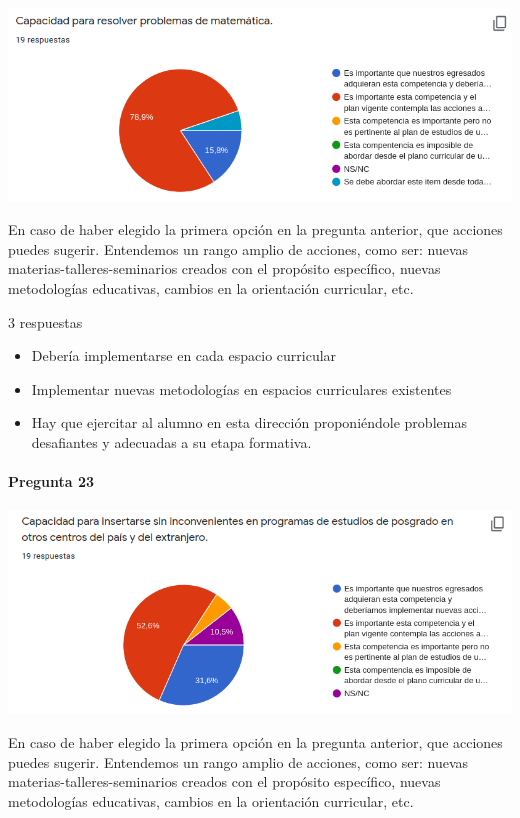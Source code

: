 \documentclass[a4paper,10pt,BCOR10mm,oneside,headsepline]{scrbook}
\begin{document}
\begin{subappendices}
\begin{center}
\includegraphics[scale=.9]{doc22.png}
 \end{center}
 
 En caso de haber elegido la primera opción en la pregunta anterior, que acciones puedes sugerir. Entendemos un rango amplio de acciones, como ser: nuevas materias-talleres-seminarios creados con el propósito específico, nuevas metodologías educativas, cambios en la orientación curricular, etc. 
 
 3 respuestas

 \begin{itemize}
  \item Debería implementarse en cada espacio curricular
  \item Implementar nuevas metodologías en espacios curriculares existentes 
  \item Hay que ejercitar al alumno en esta dirección proponiéndole   problemas desafiantes y adecuadas a su etapa formativa. 
 \end{itemize}

      \paragraph{Pregunta 23}
\begin{center}
 
\includegraphics[scale=.9]{doc23.png}
 \end{center}

   En caso de haber elegido la primera opción en la pregunta anterior, que acciones puedes sugerir. Entendemos un rango amplio de acciones, como ser: nuevas materias-talleres-seminarios creados con el propósito específico, nuevas metodologías educativas, cambios en la orientación curricular, etc. 
   

\end{subappendices}
\end{document}
